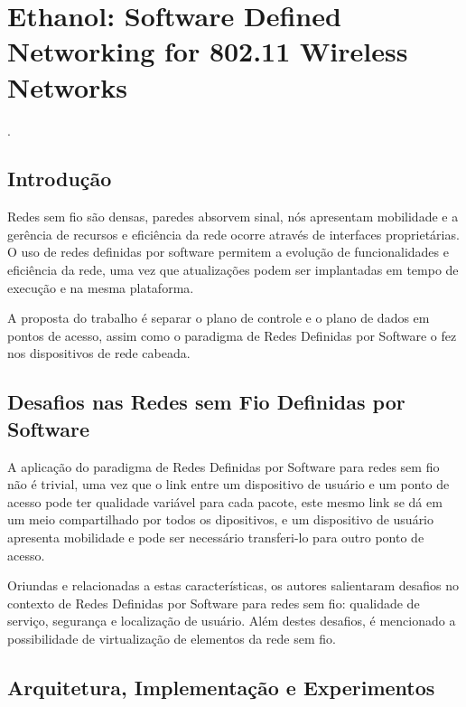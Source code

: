 
\chapter{Ethanol: Software Defined Networking for 802.11 Wireless Networks}
 \cite{moura2015ethanol}.


\section*{Introdução}

Redes sem fio são densas, paredes absorvem sinal, nós apresentam mobilidade e a gerência de recursos e eficiência da rede ocorre através de interfaces proprietárias. O uso de redes definidas por software permitem a evolução de funcionalidades e eficiência da rede, uma vez que atualizações podem ser implantadas em tempo de execução e na mesma plataforma.

A proposta do trabalho é separar o plano de controle e o plano de dados em pontos de acesso, assim como o paradigma de Redes Definidas por Software o fez nos dispositivos de rede cabeada.

\section*{Desafios nas Redes sem Fio Definidas por Software}

A aplicação do paradigma de Redes Definidas por Software para redes sem fio não é trivial, uma vez que o link entre um dispositivo de usuário e um ponto de acesso pode ter qualidade variável para cada pacote, este mesmo link se dá em um meio compartilhado por todos os dipositivos, e um dispositivo de usuário apresenta mobilidade e pode ser necessário transferi-lo para outro ponto de acesso.

Oriundas e relacionadas a estas características, os autores salientaram desafios no contexto de Redes Definidas por Software para redes sem fio: qualidade de serviço, segurança e localização de usuário. Além destes desafios, é mencionado a possibilidade de virtualização de elementos da rede sem fio.


\section*{Arquitetura, Implementação e Experimentos}

